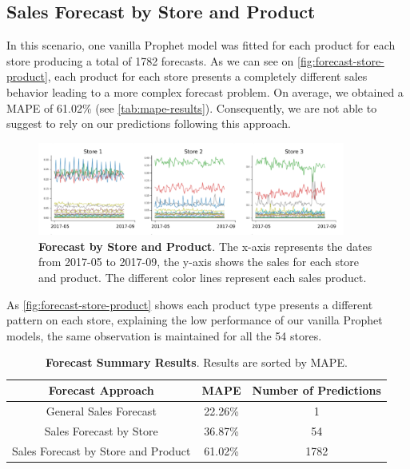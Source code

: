 \subsection[Sales Forecast by Store and Product]{Sales Forecast by Store and Product}
\label{sec:forecast-product}

In this scenario, one vanilla Prophet model was fitted for each product for each store producing a total of 1782 forecasts. As we can see on \autoref{fig:forecast-store-product}, each product for each store presents a completely different sales behavior leading to a more complex forecast problem. On average, we obtained a MAPE of 61.02\% (see \autoref{tab:mape-results}). Consequently, we are not able to suggest to rely on our predictions following this approach. 

\begin{figure}[!htb]
  \centering
  \includegraphics[width=0.9\textwidth]{plots/forecast/forecast_bystore_product.png}
  \caption[Forecast by Store and Product]{\textbf{Forecast by Store and Product}. The x-axis represents the dates from 2017-05 to 2017-09, the y-axis shows the sales for each store and product. The different color lines represent each sales product.}
  \label{fig:forecast-store-product}
\end{figure}

As \autoref{fig:forecast-store-product} shows each product type presents a different pattern on each store, explaining the low performance of our vanilla Prophet models, the same observation is maintained for all the 54 stores.

\begin{table}[!htb]
  \caption[Kaggle files description]{\textbf{Forecast Summary Results}. Results are sorted by MAPE.}
  \begin{scriptsize}
    \begin{tabulary}{0.65\linewidth}{ccc}
      \textbf{Forecast Approach} & \textbf{MAPE} & \textbf{Number of Predictions} \\ \hline
      General Sales Forecast & 22.26\% & 1  \\
      Sales Forecast by Store & 36.87\% & 54  \\
      Sales Forecast by Store and Product & 61.02\% & 1782  \\
    \end{tabulary}
  \end{scriptsize}
  \label{tab:mape-results}
\end{table}

